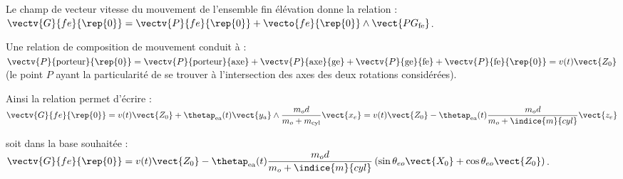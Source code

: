 \question{}
\ifprof
\begin{corrige}

Le champ de vecteur vitesse du mouvement de l'ensemble fin élévation donne la relation :
$\vectv{G}{fe}{\rep{0}} = \vectv{P}{fe}{\rep{0}} +\vecto{fe}{\rep{0}} \wedge \vect{PG_{\text{fe}}} $.

Une relation de composition de mouvement conduit à : 
$\vectv{P}{\text{porteur}}{\rep{0}} = 
\vectv{P}{\text{porteur}}{\text{axe}} 
+\vectv{P}{\text{axe}}{\text{ge}} 
+\vectv{P}{\text{ge}}{\text{fe}} 
+\vectv{P}{\text{fe}}{\rep{0}} = v(t) \vect{Z_0} $
 (le point $P$ ayant la particularité de se trouver à l'intersection des axes des deux rotations considérées).

Ainsi la relation permet d'écrire :  
$\vectv{G}{fe}{\rep{0}} 
= v(t)\vect{Z_0} + \thetap_{\text{ea}}(t)\vect{y_a}\wedge \dfrac{m_o d}{m_o + m_{\text{cyl}}} \vect{x_e}
=v(t)\vect{Z_0}-\thetap_{\text{ea}}(t) \dfrac{m_o d}{m_o+\indice{m}{cyl}} \vect{z_e}$

soit dans la base souhaitée :  $\vectv{G}{fe}{\rep{0}} 
=v(t)\vect{Z_0}-\thetap_{\text{ea}}(t) \dfrac{m_o d}{m_o+\indice{m}{cyl}} \left(\sin\theta_{eo}\vect{X_0}+\cos\theta_{eo}\vect{Z_0} \right)$.

\end{corrige}
\else
\fi

